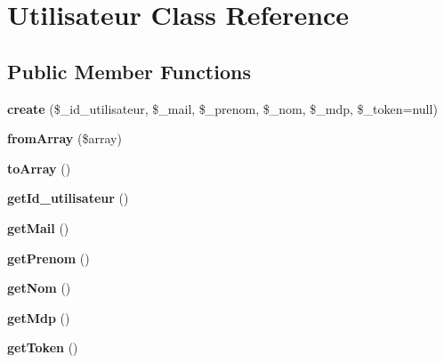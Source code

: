 \hypertarget{class_utilisateur}{}\section{Utilisateur Class Reference}
\label{class_utilisateur}
\subsection*{Public Member Functions}
\begin{DoxyCompactItemize}
\item 
\mbox{\label{class_utilisateur_a629e654b45728ea244371bd5ee65a1f4}} 
{\bfseries create} (\$\+\_\+id\+\_\+utilisateur, \$\+\_\+mail, \$\+\_\+prenom, \$\+\_\+nom, \$\+\_\+mdp, \$\+\_\+token=null)
\item 
\mbox{\label{class_utilisateur_a66a6c502659b138934bf1b3aa629a3ca}} 
{\bfseries from\+Array} (\$array)
\item 
\mbox{\label{class_utilisateur_a658defb34762c8f40085aec87e16ba1a}} 
{\bfseries to\+Array} ()
\item 
\mbox{\label{class_utilisateur_ad991e108a803a4ffb390c232cc32bcdc}} 
{\bfseries get\+Id\+\_\+utilisateur} ()
\item 
\mbox{\label{class_utilisateur_ae4923d9ec6cf4408080fc1c37e20e0ba}} 
{\bfseries get\+Mail} ()
\item 
\mbox{\label{class_utilisateur_a2a243ff78ccebcd417fd644325f44701}} 
{\bfseries get\+Prenom} ()
\item 
\mbox{\label{class_utilisateur_a184f2299ee4553fa0782ea87c9aed362}} 
{\bfseries get\+Nom} ()
\item 
\mbox{\label{class_utilisateur_a9cb89ad7e39143daa21704f565df0ff5}} 
{\bfseries get\+Mdp} ()
\item 
\mbox{\label{class_utilisateur_a211a2979c22afcd7d9056a2bb55aa449}} 
{\bfseries get\+Token} ()
\item 
\mbox{\label{class_utilisateur_a8fb52ad68b9f922838477e56349edf2d}} 

\end{DoxyCompactItemize}

